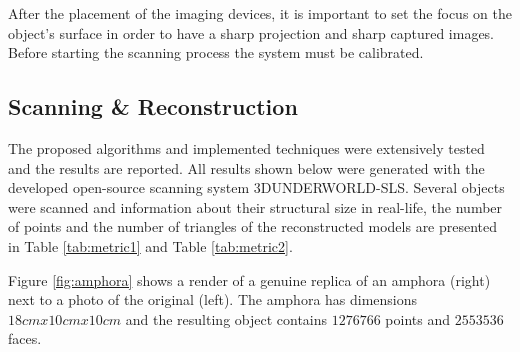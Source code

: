 \documentclass[final,12pt,3p]{elsarticle}
\begin{document}
After the placement of the imaging devices, it is important to set the focus on the object's surface in order to have a sharp projection and sharp captured images. Before starting the scanning process the system must be calibrated. 

\subsection{Scanning \& Reconstruction}
\label{subsec:scanning_reconstruction}

The proposed algorithms and implemented techniques were extensively tested and the results are reported. All results shown below were generated with the developed open-source scanning system 3DUNDERWORLD-SLS.  Several objects were scanned and information about their structural size in real-life, the number of points and the number of triangles of the reconstructed models are presented in Table \ref{tab:metric1} and Table \ref{tab:metric2}.

Figure \ref{fig:amphora} shows a render of a genuine replica of an amphora (right) next to a photo of the original (left). The amphora has dimensions $18cm x 10cm x 10cm$ and the resulting object contains $1276766$ points and $2553536$ faces.
\end{document}
